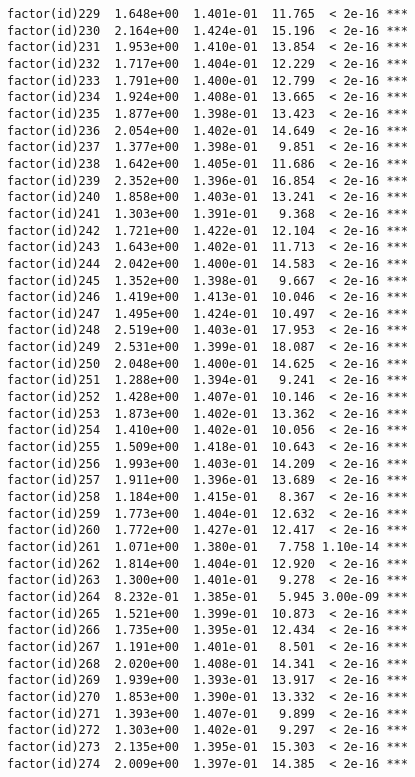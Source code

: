 \documentclass[]{article}
\begin{document}
\begin{verbatim}
factor(id)229  1.648e+00  1.401e-01  11.765  < 2e-16 ***
factor(id)230  2.164e+00  1.424e-01  15.196  < 2e-16 ***
factor(id)231  1.953e+00  1.410e-01  13.854  < 2e-16 ***
factor(id)232  1.717e+00  1.404e-01  12.229  < 2e-16 ***
factor(id)233  1.791e+00  1.400e-01  12.799  < 2e-16 ***
factor(id)234  1.924e+00  1.408e-01  13.665  < 2e-16 ***
factor(id)235  1.877e+00  1.398e-01  13.423  < 2e-16 ***
factor(id)236  2.054e+00  1.402e-01  14.649  < 2e-16 ***
factor(id)237  1.377e+00  1.398e-01   9.851  < 2e-16 ***
factor(id)238  1.642e+00  1.405e-01  11.686  < 2e-16 ***
factor(id)239  2.352e+00  1.396e-01  16.854  < 2e-16 ***
factor(id)240  1.858e+00  1.403e-01  13.241  < 2e-16 ***
factor(id)241  1.303e+00  1.391e-01   9.368  < 2e-16 ***
factor(id)242  1.721e+00  1.422e-01  12.104  < 2e-16 ***
factor(id)243  1.643e+00  1.402e-01  11.713  < 2e-16 ***
factor(id)244  2.042e+00  1.400e-01  14.583  < 2e-16 ***
factor(id)245  1.352e+00  1.398e-01   9.667  < 2e-16 ***
factor(id)246  1.419e+00  1.413e-01  10.046  < 2e-16 ***
factor(id)247  1.495e+00  1.424e-01  10.497  < 2e-16 ***
factor(id)248  2.519e+00  1.403e-01  17.953  < 2e-16 ***
factor(id)249  2.531e+00  1.399e-01  18.087  < 2e-16 ***
factor(id)250  2.048e+00  1.400e-01  14.625  < 2e-16 ***
factor(id)251  1.288e+00  1.394e-01   9.241  < 2e-16 ***
factor(id)252  1.428e+00  1.407e-01  10.146  < 2e-16 ***
factor(id)253  1.873e+00  1.402e-01  13.362  < 2e-16 ***
factor(id)254  1.410e+00  1.402e-01  10.056  < 2e-16 ***
factor(id)255  1.509e+00  1.418e-01  10.643  < 2e-16 ***
factor(id)256  1.993e+00  1.403e-01  14.209  < 2e-16 ***
factor(id)257  1.911e+00  1.396e-01  13.689  < 2e-16 ***
factor(id)258  1.184e+00  1.415e-01   8.367  < 2e-16 ***
factor(id)259  1.773e+00  1.404e-01  12.632  < 2e-16 ***
factor(id)260  1.772e+00  1.427e-01  12.417  < 2e-16 ***
factor(id)261  1.071e+00  1.380e-01   7.758 1.10e-14 ***
factor(id)262  1.814e+00  1.404e-01  12.920  < 2e-16 ***
factor(id)263  1.300e+00  1.401e-01   9.278  < 2e-16 ***
factor(id)264  8.232e-01  1.385e-01   5.945 3.00e-09 ***
factor(id)265  1.521e+00  1.399e-01  10.873  < 2e-16 ***
factor(id)266  1.735e+00  1.395e-01  12.434  < 2e-16 ***
factor(id)267  1.191e+00  1.401e-01   8.501  < 2e-16 ***
factor(id)268  2.020e+00  1.408e-01  14.341  < 2e-16 ***
factor(id)269  1.939e+00  1.393e-01  13.917  < 2e-16 ***
factor(id)270  1.853e+00  1.390e-01  13.332  < 2e-16 ***
factor(id)271  1.393e+00  1.407e-01   9.899  < 2e-16 ***
factor(id)272  1.303e+00  1.402e-01   9.297  < 2e-16 ***
factor(id)273  2.135e+00  1.395e-01  15.303  < 2e-16 ***
factor(id)274  2.009e+00  1.397e-01  14.385  < 2e-16 ***

\end{verbatim}
\end{document}
